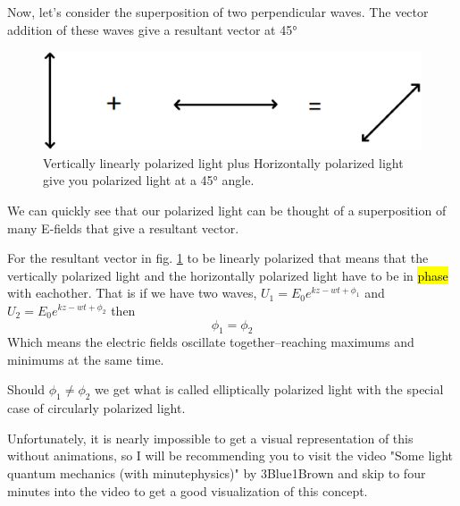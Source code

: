 \documentclass{article}
\begin{document}
Now, let's consider the superposition of two perpendicular waves. The vector addition of these waves give a resultant vector at 45°
\begin{figure}[!phbt]
    \centering
    \includegraphics[width=0.5\linewidth]{img/45polarized.eps}
    \caption{Vertically linearly polarized light plus Horizontally polarized light give you polarized light at a 45° angle.}
    \label{fig:45polarized}
\end{figure}
We can quickly see that our polarized light can be thought of a superposition of many E-fields that give a resultant vector.

For the resultant vector in fig. \ref{fig:45polarized} to be linearly polarized that means that the vertically polarized light and the horizontally polarized light have to be in \hl{phase} with eachother. That is if we have two waves, $U_1 = E_0e^{kz-wt + \phi_1}$ and $U_2 = E_0e^{kz-wt + \phi_2}$ then
\begin{equation*}
    \phi_1 = \phi_2
\end{equation*}
Which means the electric fields oscillate together--reaching maximums and minimums at the same time.

Should $\phi_1 \neq \phi_2$ we get what is called elliptically polarized light with the special case of circularly polarized light.

Unfortunately, it is nearly impossible to get a visual representation of this without animations, so I will be recommending you to visit the video "Some light quantum mechanics (with minutephysics)" by 3Blue1Brown and skip to four minutes into the video to get a good visualization of this concept.
\\
\
\\
\begin{figure}[!phbt]
    \centering
    \href{https://youtu.be/MzRCDLre1b4}{
    }
\end{figure}
\end{document}
